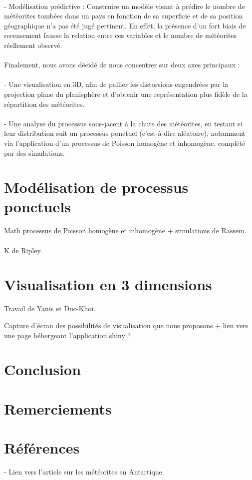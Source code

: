 \documentclass[12pt]{article}
\begin{document}
\\
- Modélisation prédictive : Construire un modèle visant à prédire le nombre de météorites tombées dans un pays en fonction de sa superficie et de sa position géographique n’a pas été jugé pertinent. En effet, la présence d’un fort biais de recensement fausse la relation entre ces variables et le nombre de météorites réellement observé.\\
\\
Finalement, nous avons décidé de nous concentrer sur deux axes principaux :\\
\\
- Une visualisation en 3D, afin de pallier les distorsions engendrées par la projection plane du planisphère et d’obtenir une représentation plus fidèle de la répartition des météorites.\\
\\
- Une analyse du processus sous-jacent à la chute des météorites, en testant si leur distribution suit un processus ponctuel (c’est-à-dire aléatoire), notamment via l’application d’un processus de Poisson homogène et inhomogène, complété par des simulations.

\section{Modélisation de processus ponctuels}
Math processus de Poisson homogène et inhomogène + simulations de Rassem.\\
\\
K de Ripley.\\
\section{Visualisation en 3 dimensions}
Travail de Yanis et Duc-Khoi.

Capture d'écran des possibilités de visualisation que nous proposons + lien vers une page hébergeant l'application shiny ?

\section{Conclusion}
\section{Remerciements}
\section{Références}
\printbibliography
- Lien vers l'article sur les météorites en Antartique.
\end{document}
